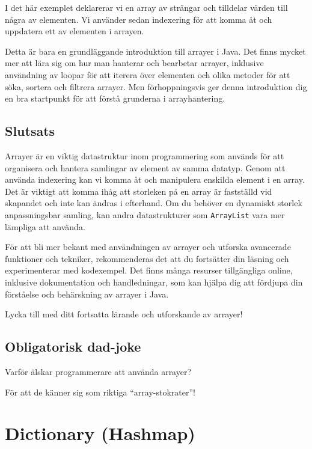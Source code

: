 I det här exemplet deklarerar vi en array av strängar och tilldelar
värden till några av elementen. Vi använder sedan indexering för att
komma åt och uppdatera ett av elementen i arrayen.

Detta är bara en grundläggande introduktion till arrayer i Java. Det
finns mycket mer att lära sig om hur man hanterar och bearbetar arrayer,
inklusive användning av loopar för att iterera över elementen och olika
metoder för att söka, sortera och filtrera arrayer. Men förhoppningsvis
ger denna introduktion dig en bra startpunkt för att förstå grunderna i
arrayhantering.

\hypertarget{slutsats}{%
\subsection{Slutsats}\label{slutsats}}

Arrayer är en viktig datastruktur inom programmering som används för att
organisera och hantera samlingar av element av samma datatyp. Genom att
använda indexering kan vi komma åt och manipulera enskilda element i en
array. Det är viktigt att komma ihåg att storleken på en array är
fastställd vid skapandet och inte kan ändras i efterhand. Om du behöver
en dynamiskt storlek anpassningsbar samling, kan andra datastrukturer
som \texttt{ArrayList} vara mer lämpliga att använda.

För att bli mer bekant med användningen av arrayer och utforska
avancerade funktioner och tekniker, rekommenderas det att du fortsätter
din läsning och experimenterar med kodexempel. Det finns många resurser
tillgängliga online, inklusive dokumentation och handledningar, som kan
hjälpa dig att fördjupa din förståelse och behärskning av arrayer i
Java.

Lycka till med ditt fortsatta lärande och utforskande av arrayer!

\hypertarget{obligatorisk-dad-joke}{%
\subsection{Obligatorisk dad-joke}\label{obligatorisk-dad-joke}}

Varför älskar programmerare att använda arrayer?

För att de känner sig som riktiga ``array-stokrater''!

\hypertarget{dictionary-hashmap}{%
\section{Dictionary (Hashmap)}\label{dictionary-hashmap}}


